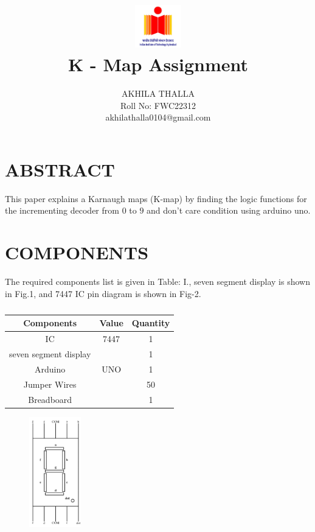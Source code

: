 \documentclass[conference]{IEEEtran}
\title{
\vspace{1cm}
{\includegraphics[width=0.15\textwidth]{1.jpg} \\ K - Map Assignment} }
\author{AKHILA THALLA\\ Roll No: FWC22312 \\ akhilathalla0104@gmail.com}
\begin{document}
\maketitle
 \section {ABSTRACT}
 This paper explains a Karnaugh maps (K-map) by finding the logic functions for the incrementing decoder from $0$ to $9$ and don't care condition using arduino uno.

\section{COMPONENTS}
The required components list is given in Table: I., seven segment display is shown in Fig.1, and 7447 IC pin diagram is shown in Fig-2.
\vspace{0.3cm}
 \begin{table} [htbp]
\centering
\begin{tabular}{| c | c | c |} \hline
Components & Value & Quantity \\\hline
IC & 7447 & 1 \\ \hline
seven segment display & & 1\\ \hline
Arduino & UNO & 1 \\ \hline
Jumper Wires &  & 50 \\ \hline
Breadboard & & 1 \\ 
\hline
\end{tabular}
\vspace{0.3cm}
\caption{\label{tab:widgets}}
\end{table}

\begin{figure}[h]                           
\centering                                 
\includegraphics[width=0.2\textwidth]{2.jpg}                                           
\caption{\label{fig-1:Gates}}               
\end{figure}
\end{document}
